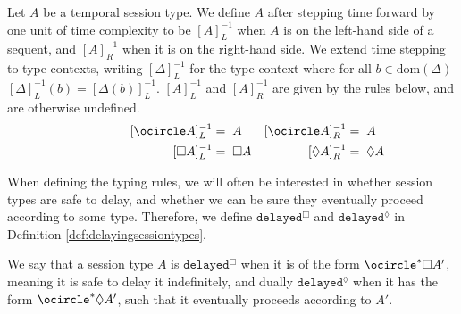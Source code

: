 \begin{defi}
Let $A$ be a temporal session type. We define $A$ after stepping time forward by one unit of time complexity to be $[A]^{-1}_L$ when $A$ is on the left-hand side of a sequent, and $[A]^{-1}_R$ when it is on the right-hand side. We extend time stepping to type contexts, writing $[\Delta]^{-1}_L$ for the type context where for all $b\in\text{dom}(\Delta)$ $[\Delta]^{-1}_L(b)=[\Delta(b)]^{-1}_L$. $[A]^{-1}_L$ and $[A]^{-1}_R$ are given by the rules below, and are otherwise undefined.
\begin{align*}
    \kern4em[\ocircle A]^{-1}_L &=\; A   &[\ocircle A]^{-1}_R &=\; A\\
    \kern4em[\Box A]^{-1}_L &=\; \Box A    &[\lozenge A]^{-1}_R &=\; \lozenge A\\
\end{align*}
\label{def:timestepping}
\end{defi}
%

When defining the typing rules, we will often be interested in whether session types are safe to delay, and whether we can be sure they eventually proceed according to some type. Therefore, we define $\texttt{delayed}^\Box$ and $\texttt{delayed}^\lozenge$ in Definition \ref{def:delayingsessiontypes}.
\begin{defi}
We say that a session type $A$ is $\texttt{delayed}^\Box$ when it is of the form $\ocircle^*\Box A'$, meaning it is safe to delay it indefinitely, and dually $\texttt{delayed}^\lozenge$ when it has the form $\ocircle^*\lozenge A'$, such that it eventually proceeds according to $A'$. 
\label{def:delayingsessiontypes}
\end{defi}


